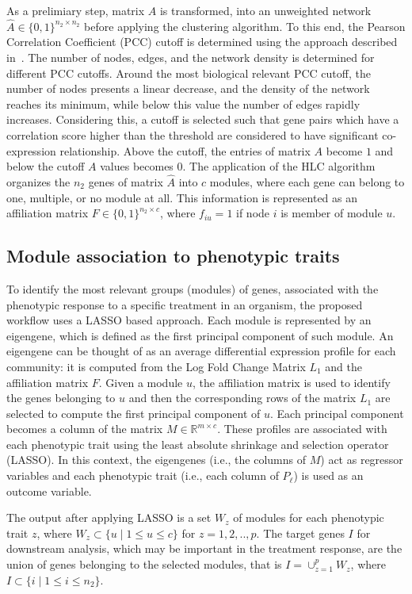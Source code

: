 As a prelimiary step, matrix $A$ is transformed, into an unweighted network $\hat{A} \in \{0,1\}^{n_2 \times n_2}$ before applying the clustering algorithm. To this end, the Pearson Correlation Coefficient (PCC) cutoff is determined using the approach described in~\cite{aoki2007approaches}. The number of nodes, edges, and the network density is determined for different PCC cutoffs. Around the most biological relevant PCC cutoff, the number of nodes presents a linear decrease, and the density of the network reaches its minimum, while below this value the number of edges rapidly increases. Considering this, a cutoff is selected such that gene pairs which have a correlation score higher than the threshold are considered to have significant co-expression relationship. Above the cutoff, the entries of matrix $A$ become $1$ and below the cutoff $A$ values becomes $0$. The application of the HLC algorithm organizes the $n_2$ genes of matrix $\hat{A}$ into $c$ modules, where each gene can belong to one, multiple, or no module at all. This information is represented as an affiliation matrix $F \in \{0,1\}^{n_2 \times c}$, where $f_{iu} = 1$ if node $i$ is member of module $u$.

\subsection{Module association to phenotypic traits}

To identify the most relevant groups (modules) of genes, associated
with the phenotypic response to a specific treatment in an organism,
the proposed workflow uses a LASSO based approach. Each module is
represented by an eigengene, which is defined as the first principal
component of such module. An eigengene can be thought of as an average
differential expression profile for each community: it is computed
from the Log Fold Change Matrix $L_1$ and the affiliation matrix
$F$. Given a module $u$, the affiliation matrix is used to identify
the genes belonging to $u$ and then the corresponding rows of the
matrix $L_1$ are selected to compute the first principal component of
$u$. Each principal component becomes a column of the matrix $M \in
\mathbb{R}^{m \times c}$.
These profiles are associated with each phenotypic trait using 
the least absolute shrinkage and selection operator (LASSO). 
In this context, the eigengenes (i.e., the columns of $M$) act as regressor variables
and each phenotypic trait (i.e., each column of $P_\ell$) is used as an outcome variable.

The output after applying LASSO is a set $W_z$ of modules for each
phenotypic trait $z$, where $W_z \subset \{u \mid 1 \leq u \leq c\}$ for
$z= 1,2,..,p$. The target genes $I$ for downstream analysis, which may
be important in the treatment response, are the union of genes belonging
to the selected modules, that is $I = \cup_{z=1}^{p} W_z$, where
$I \subset \{i \mid 1 \leq i \leq n_2\}$.

